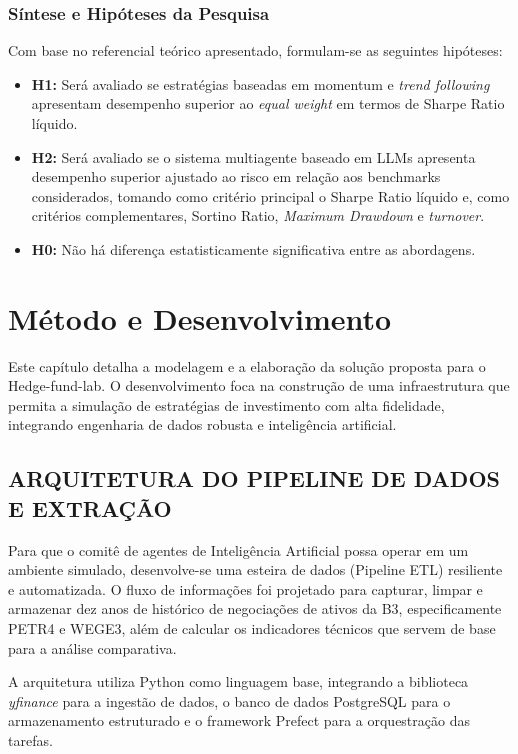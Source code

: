\documentclass{eic-bcc-tcc}
\begin{document}
\subsection{Síntese e Hipóteses da Pesquisa}

Com base no referencial teórico apresentado, formulam-se as seguintes hipóteses:

\begin{itemize}
\item \textbf{H1:} Será avaliado se estratégias baseadas em momentum e \textit{trend following} apresentam desempenho superior ao \textit{equal weight} em termos de Sharpe Ratio líquido.
\item \textbf{H2:} Será avaliado se o sistema multiagente baseado em LLMs apresenta desempenho superior ajustado ao risco em relação aos benchmarks considerados, tomando como critério principal o Sharpe Ratio líquido e, como critérios complementares, Sortino Ratio, \textit{Maximum Drawdown} e \textit{turnover}.
\item \textbf{H0:} Não há diferença estatisticamente significativa entre as abordagens.
\end{itemize}

\chapter{Método e Desenvolvimento}
\label{cha:metodo}

Este capítulo detalha a modelagem e a elaboração da solução proposta para o Hedge-fund-lab. O desenvolvimento foca na construção de uma infraestrutura que permita a simulação de estratégias de investimento com alta fidelidade, integrando engenharia de dados robusta e inteligência artificial.

\section{ARQUITETURA DO PIPELINE DE DADOS E EXTRAÇÃO}

Para que o comitê de agentes de Inteligência Artificial possa operar em um ambiente simulado, desenvolve-se uma esteira de dados (Pipeline ETL) resiliente e automatizada. O fluxo de informações foi projetado para capturar, limpar e armazenar dez anos de histórico de negociações de ativos da B3, especificamente PETR4 e WEGE3, além de calcular os indicadores técnicos que servem de base para a análise comparativa.

A arquitetura utiliza Python como linguagem base, integrando a biblioteca \textit{yfinance} para a ingestão de dados, o banco de dados PostgreSQL para o armazenamento estruturado e o framework Prefect para a orquestração das tarefas.
\end{document}
